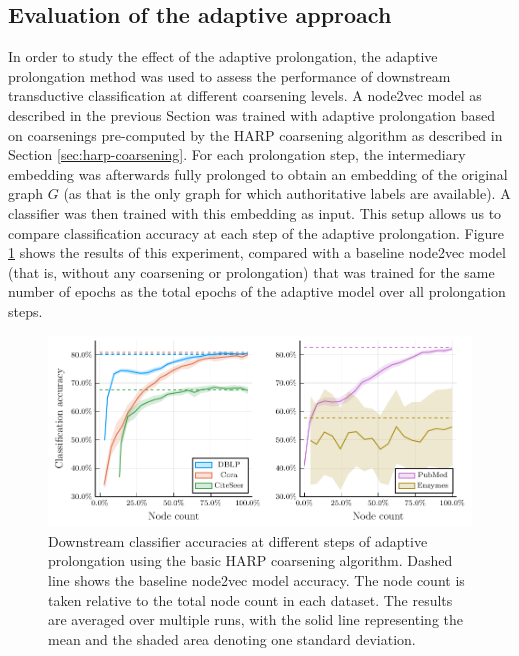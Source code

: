 \subsection{Evaluation of the adaptive approach}\label{sec:adaptive-experiments}

In order to study the effect of the adaptive prolongation, the adaptive prolongation method was used to assess the performance of downstream transductive classification at different coarsening levels. A node2vec model as described in the previous Section was trained with adaptive prolongation based on coarsenings pre-computed by the HARP coarsening algorithm as described in Section \ref{sec:harp-coarsening}. For each prolongation step, the intermediary embedding was afterwards fully prolonged to obtain an embedding of the original graph \( G \) (as that is the only graph for which authoritative labels are available). A classifier was then trained with this embedding as input. This setup allows us to compare classification accuracy at each step of the adaptive prolongation. Figure \ref{fig:adaptive-coarsening} shows the results of this experiment, compared with a baseline node2vec model (that is, without any coarsening or prolongation) that was trained for the same number of epochs as the total epochs of the adaptive model over all prolongation steps.

\begin{figure}
  \centering
  \includegraphics[width = \linewidth]{images/adaptive-coarsening/adaptive-coarsening.pdf}
  \caption{Downstream classifier accuracies at different steps of adaptive prolongation using the basic HARP coarsening algorithm. Dashed line shows the baseline node2vec model accuracy. The node count is taken relative to the total node count in each dataset. The results are averaged over multiple runs, with the solid line representing the mean and the shaded area denoting one standard deviation.}
  \label{fig:adaptive-coarsening}
\end{figure}

